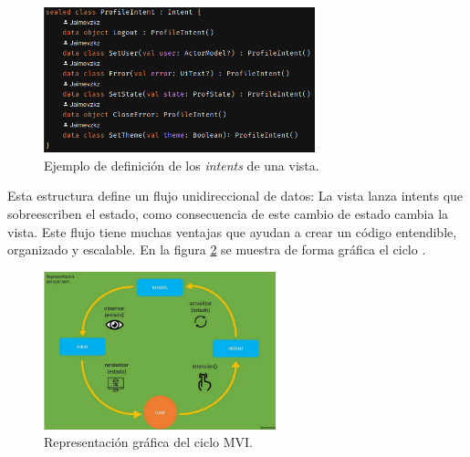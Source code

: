 \begin{itemize}
    \begin{figure}[h]
        \centering
        \includegraphics[width = 0.7\textwidth]{Imagenes/Fuentes/ejemplo_intent.png}
        \caption{Ejemplo de definición de los \textit{intents} de una vista.}
        \label{fig:ejemplo_intent}
    \end{figure}
\end{itemize}

Esta estructura define un flujo unidireccional de datos: La vista lanza intents que sobreescriben el estado, como consecuencia de este cambio de estado cambia la vista. Este flujo tiene muchas ventajas que ayudan a crear un código entendible, organizado y escalable. En la figura \ref{fig:visualMvi} se muestra de forma gráfica el ciclo
\hyperlink{cap:biblio}{}.
\begin{figure}[h]
    \centering
    \includegraphics[width = 0.6\textwidth]{Imagenes/Fuentes/visual_mvi.png}
    \caption{Representación gráfica del ciclo MVI.}
    \label{fig:visualMvi}
\end{figure}

